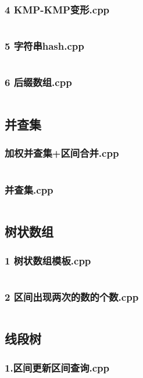 \documentclass[a4paper,11pt]{article}
\begin{document}
\subsubsection{4 KMP-KMP变形.cpp}
\inputminted{c++}{"D:/tmplz/templates/数据结构/字符串/4 KMP-KMP变形.cpp"}
\subsubsection{5 字符串hash.cpp}
\inputminted{c++}{"D:/tmplz/templates/数据结构/字符串/5 字符串hash.cpp"}
\subsubsection{6 后缀数组.cpp}
\inputminted{c++}{"D:/tmplz/templates/数据结构/字符串/6 后缀数组.cpp"}
\subsection{并查集}
\subsubsection{加权并查集+区间合并.cpp}
\inputminted{c++}{"D:/tmplz/templates/数据结构/并查集/加权并查集+区间合并.cpp"}
\subsubsection{并查集.cpp}
\inputminted{c++}{"D:/tmplz/templates/数据结构/并查集/并查集.cpp"}
\subsection{树状数组}
\subsubsection{1 树状数组模板.cpp}
\inputminted{c++}{"D:/tmplz/templates/数据结构/树状数组/1 树状数组模板.cpp"}
\subsubsection{2 区间出现两次的数的个数.cpp}
\inputminted{c++}{"D:/tmplz/templates/数据结构/树状数组/2 区间出现两次的数的个数.cpp"}
\subsection{线段树}
\subsubsection{1.区间更新区间查询.cpp}
\inputminted{c++}{"D:/tmplz/templates/数据结构/线段树/1.区间更新区间查询.cpp"}
\end{document}
